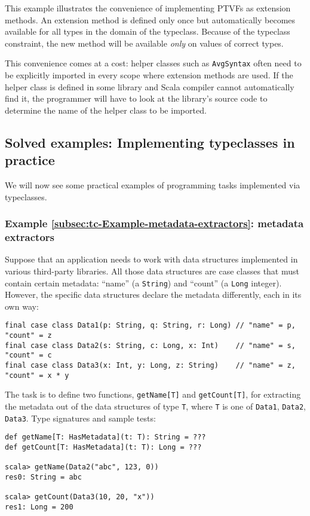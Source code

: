 This example illustrates the convenience of implementing PTVFs as
extension methods. An extension method is defined only once but automatically
becomes available for all types in the domain of the typeclass. Because
of the typeclass constraint, the new method will be available \emph{only}
on values of correct types.

This convenience comes at a cost: helper classes such as \lstinline!AvgSyntax!
often need to be explicitly imported in every scope where extension
methods are used. If the helper class is defined in some library and
Scala compiler cannot automatically find it, the programmer will have
to look at the library's source code to determine the name of the
helper class to be imported.

\subsection{Solved examples: Implementing typeclasses in practice}

We will now see some practical examples of programming tasks implemented
via typeclasses.

\subsubsection{Example \label{subsec:tc-Example-metadata-extractors}\ref{subsec:tc-Example-metadata-extractors}:
metadata extractors}

Suppose that an application needs to work with data structures implemented
in various third-party libraries. All those data structures are case
classes that must contain certain metadata: ``name'' (a \lstinline!String!)
and ``count'' (a \lstinline!Long! integer). However, the specific
data structures declare the metadata differently, each in its own
way:
\begin{lstlisting}
final case class Data1(p: String, q: String, r: Long) // "name" = p, "count" = z
final case class Data2(s: String, c: Long, x: Int)    // "name" = s, "count" = c
final case class Data3(x: Int, y: Long, z: String)    // "name" = z, "count" = x * y
\end{lstlisting}
The task is to define two functions, \lstinline!getName[T]! and \lstinline!getCount[T]!,
for extracting the metadata out of the data structures of type \lstinline!T!,
where \lstinline!T! is one of \lstinline!Data1!, \lstinline!Data2!,
\lstinline!Data3!. Type signatures and sample tests:
\begin{lstlisting}
def getName[T: HasMetadata](t: T): String = ???
def getCount[T: HasMetadata](t: T): Long = ???

scala> getName(Data2("abc", 123, 0))
res0: String = abc

scala> getCount(Data3(10, 20, "x"))
res1: Long = 200
\end{lstlisting}


